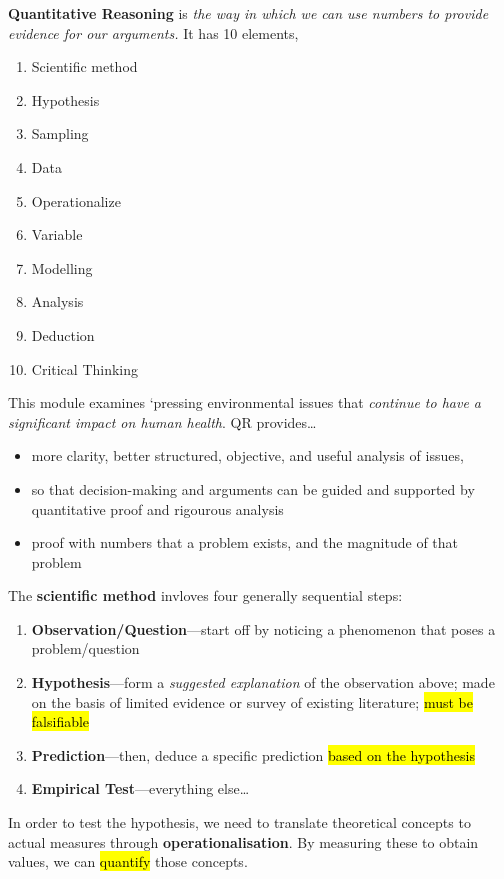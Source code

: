 \documentclass{article}
\newcommand{\headingsmall}[1]{{\small\textbf{#1}}}
\begin{document}
\begin{multicols*}{4}
\headingsmall{Quantitative Reasoning} is \textit{
    the way in which we can use numbers to provide evidence for our 
    arguments.
} It has 10 elements,
\begin{enumerate} \itemsep -0.5em
    \item Scientific method
    \item Hypothesis
    \item Sampling
    \item Data
    \item Operationalize
    \item Variable
    \item Modelling
    \item Analysis
    \item Deduction
    \item Critical Thinking
\end{enumerate}
This module examines `pressing environmental issues that
\textit{continue to have a significant impact on human health}. QR
provides\dots
\begin{itemize} \itemsep -0.5em
    \item more clarity, better structured, objective, and useful 
        analysis of issues, 
    \item so that decision-making and arguments can be guided and
        supported by quantitative proof and rigourous analysis
    \item proof with numbers that a problem exists, and the magnitude
        of that problem
\end{itemize}

The \headingsmall{scientific method} invloves four generally 
sequential steps:
\begin{enumerate} \itemsep -0.5em
    \item \textbf{Observation/Question}---start off by noticing a phenomenon
        that poses a problem/question
    \item \textbf{Hypothesis}---form a \textit{suggested explanation} of the
        observation above; made on the basis of limited evidence or
        survey of existing literature; \hl{must be falsifiable}
    \item \textbf{Prediction}---then, deduce a specific prediction
        \hl{based on the hypothesis}
    \item \textbf{Empirical Test}---everything else\dots
\end{enumerate}

In order to test the hypothesis, we need to translate theoretical
concepts to actual measures through \headingsmall{operationalisation}.
By measuring these to obtain values, we can \hl{quantify} those concepts. \\


\end{multicols*}
\end{document}
